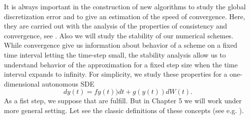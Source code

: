	It is always important in the construction of  new algorithms to study  the global
discretization error and to give an estimation of the speed of convergence. Here, they are
carried out with  the analysis of the properties of consistency and convergence, see
\cite{Kloeden1992}. 
Also we will study the stability of our numerical schemes. While convergence give us
information about behavior of a scheme on a fixed time interval letting the time-step small, the stability analysis
allow us to understand behavior of the approximation for a fixed step size when the time interval expands to infinity.
For simplicity, we study these properties for a one-dimensional autonomous SDE
\begin{equation}\label{eqn:autonomousSDE}
	dy(t)=fy(t))dt+g(y(t))dW(t).
\end{equation}
As a fist step, we suppose that  are fulfill. But in Chapter 5 we will work under
more general setting. Let see the classic definitions of these concepts (see e.g. \cite{Kloeden1992}).

